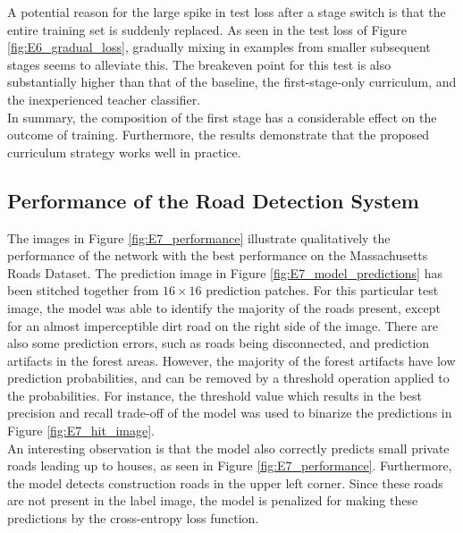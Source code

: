 A potential reason for the large spike in test loss after a stage switch is that the entire training set is suddenly replaced. As seen in the test loss of Figure \ref{fig:E6_gradual_loss}, gradually mixing in examples from smaller subsequent stages seems to alleviate this. The breakeven point for this test is also substantially higher than that of the baseline, the first-stage-only curriculum, and the inexperienced teacher classifier.\\

In summary, the composition of the first stage has a considerable effect on the outcome of training. Furthermore, the results demonstrate that the proposed curriculum strategy works well in practice.

\subsection{Performance of the Road Detection System}
The images in Figure \ref{fig:E7_performance} illustrate qualitatively the performance of the network with the best performance on the Massachusetts Roads Dataset. The prediction image in Figure \ref{fig:E7_model_predictions} has been stitched together from $16 \times 16$ prediction patches. For this particular test image, the model was able to identify the majority of the roads present, except for an almost imperceptible dirt road on the right side of the image. There are also some prediction errors, such as roads being disconnected, and prediction artifacts in the forest areas. However, the majority of the forest artifacts have low prediction probabilities, and can be removed by a threshold operation applied to the probabilities. For instance, the threshold value which results in the best precision and recall trade-off of the model was used to binarize the predictions in Figure \ref{fig:E7_hit_image}.\\

An interesting observation is that the model also correctly predicts small private roads leading up to houses, as seen in Figure \ref{fig:E7_performance}. Furthermore, the model detects construction roads in the upper left corner. Since these roads are not present in the label image, the model is penalized for making these predictions by the cross-entropy loss function.\\

